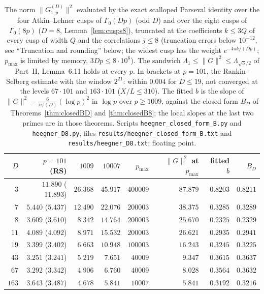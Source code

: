 \documentclass[11pt]{amsart}
\theoremstyle{remark}
\begin{document}
\begin{table}[htbp]
\centering\footnotesize\setlength{\tabcolsep}{4pt}
\begin{tabular}{r|rrr|rr|rr}
\toprule
$D$ & $p=101$ (RS) & $1009$ & $10007$ & $p_{\max}$ & $\|G\|^2$ at $p_{\max}$ & fitted $b$ & $B_D$\\
\midrule
$3$ & $11.890$ ($11.893$) & $26.368$ & $45.917$ & $400009$ & $87.879$ & $0.8203$ & $0.8211$\\
$7$ & $5.440$ ($5.437$) & $12.490$ & $22.076$ & $200003$ & $38.375$ & $0.3285$ & $0.3289$\\
$8$ & $3.609$ ($3.610$) & $8.342$ & $14.764$ & $200003$ & $25.670$ & $0.2325$ & $0.2329$\\
$11$ & $4.089$ ($4.092$) & $8.971$ & $15.532$ & $200003$ & $26.621$ & $0.2935$ & $0.2941$\\
$19$ & $3.399$ ($3.402$) & $6.663$ & $10.948$ & $100003$ & $16.243$ & $0.3245$ & $0.3225$\\
$43$ & $3.251$ ($3.241$) & $5.219$ & $7.651$ & $40009$ & $9.347$ & $0.3615$ & $0.3637$\\
$67$ & $3.292$ ($3.342$) & $4.906$ & $6.760$ & $40009$ & $8.028$ & $0.3564$ & $0.3632$\\
$163$ & $3.643$ ($3.487$) & $4.678$ & $5.841$ & $10007$ & $5.841$ & $0.3192$ & $0.3216$\\
\bottomrule
\end{tabular}
\medskip
\caption{The norm $\|G^{(D)}_{1,p}\|^2$ evaluated by the exact scalloped Parseval identity over the four Atkin--Lehner cusps of $\Gamma_0(Dp)$ (odd $D$) and over the eight cusps of $\Gamma_0(8p)$ ($D=8$, Lemma~\ref{lem:cusps8}), truncated at the coefficients $k\le3Q$ of every cusp of width $Q$ and the correlations $j\le8$ (truncation errors below $10^{-12}$, see ``Truncation and rounding'' below; the widest cusp has the weight $e^{-4\pi k/(Dp)}$; $p_{\max}$ is limited by memory, $3Dp\le8\cdot10^6$). The sandwich $\Lambda_1\le\|G\|^2\le\Lambda_{\sqrt3/2}$ of Part~II, Lemma~6.11 holds at every $p$. In brackets at $p=101$, the Rankin--Selberg estimate with the window $2^{21}$: within $0.004$ for $D\le19$, not converged at the levels $67\cdot101$ and $163\cdot101$ ($X/L\le310$). The fitted $b$ is the slope of $\|G\|^2-\frac6{\pi\psi(D)}(\log p)^2$ in $\log p$ over $p\ge1009$, against the closed form $B_D$ of Theorems~\ref{thm:closedBD} and \ref{thm:closedB8}; the local slopes at the last two primes are in those theorems. Scripts \texttt{heegner\_closed\_form\_B.py} and \texttt{heegner\_D8.py}, files \texttt{results/heegner\_closed\_form\_B.txt} and \texttt{results/heegner\_D8.txt}; floating point.}
\label{tab:oddnorm}
\end{table}
\end{document}
